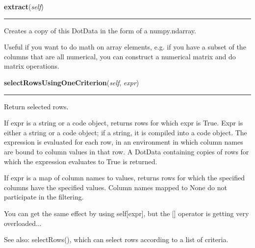     \vspace{0.5ex}

\hspace{.8\funcindent}\begin{boxedminipage}{\funcwidth}

    \raggedright \textbf{extract}(\textit{self})

    \vspace{-1.5ex}

    \rule{\textwidth}{0.5\fboxrule}
\setlength{\parskip}{2ex}
    Creates a copy of this DotData in the form of a numpy.ndarray.

    Useful if you want to do math on array elements, e.g. if you have a 
    subset of the columns that are all numerical, you can construct a 
    numerical matrix and do matrix operations.

\setlength{\parskip}{1ex}
    \end{boxedminipage}

    \label{Classes:DotData:DotData:selectRowsUsingOneCriterion}

    \vspace{0.5ex}

\hspace{.8\funcindent}\begin{boxedminipage}{\funcwidth}

    \raggedright \textbf{selectRowsUsingOneCriterion}(\textit{self}, \textit{expr})

    \vspace{-1.5ex}

    \rule{\textwidth}{0.5\fboxrule}
\setlength{\parskip}{2ex}
    Return selected rows.

    If expr is a string or a code object, returns rows for which expr is 
    True.  Expr is either a string or a code object; if a string, it is 
    compiled into a code object.  The expression is evaluated for each row,
    in an environment in which column names are bound to column values in 
    that row. A DotData containing copies of rows for which the expression 
    evaluates to True is returned.

    If expr is a map of column names to values, returns rows for which the 
    specified columns have the specified values. Column names mapped to 
    None do not participate in the filtering.

    You can get the same effect by using self[expr], but the [] operator is
    getting very overloaded...

    See also: selectRows(), which can select rows according to a list of 
    criteria.

\setlength{\parskip}{1ex}
    \end{boxedminipage}

